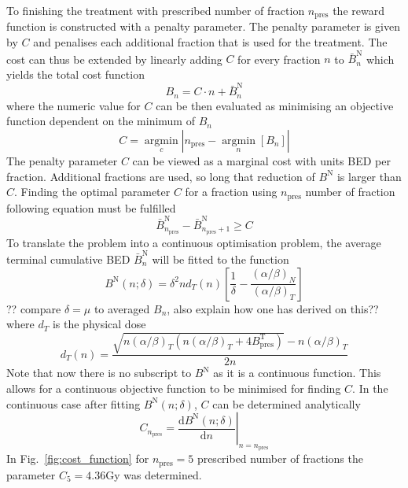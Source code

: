 \documentclass[\relativeRoot/ada.tex]{subfiles}
\begin{document}
To finishing the treatment with prescribed number of fraction $n_{\text{pres}}$ the reward function is constructed with a penalty parameter. The penalty parameter is given by $C$ and penalises each additional fraction  that is used for the treatment. The cost can thus be extended by linearly adding $C$ for every fraction $n$ to $\bar{B}^{\text{N}}_n$ which yields the total cost function
\begin{equation*}
    B_n = C \cdot n + \bar{B}^{\text{N}}_n
\end{equation*}
where the numeric value for $C$ can be then evaluated as minimising an objective function dependent on the minimum of $B_n$
\begin{equation*}
    C = \underset{c}{\operatorname{argmin}}\left| n_{\text{pres}} - \underset{n}{\operatorname{argmin}} \left[B_n \right] \right|
\end{equation*}
The penalty parameter $C$ can be viewed as a marginal cost with units BED per fraction. Additional fractions are used, so long that reduction of $B^{\text{N}}$ is larger than $C$. Finding the optimal parameter $C$ for a fraction using $n_{\text{pres}}$ number of fraction following equation must be fulfilled
\begin{equation*}
    \bar{B}^{\text{N}}_{n_{\text{pres}}} - \bar{B}^{\text{N}}_{n_{\text{pres}}+1} \geq C
\end{equation*}
To translate the problem into a continuous optimisation problem, the average terminal cumulative BED $\bar{B}^{\text{N}}_n$ will be fitted to the function
\begin{equation}
    B^{\text{N}}(n; \delta) = \delta^2 n d_T(n) \left[ \frac{1}{\delta} - \frac{(\alpha / \beta) _N}{(\alpha / \beta)_T}\right]
\end{equation}
?? compare $\delta=\mu$ to averaged $B_n$, also explain how one has derived on this??
where $d_T$ is the physical dose
\begin{equation*}
    d_T(n) = \frac{\sqrt{n (\alpha / \beta)_T (n (\alpha / \beta)_T + 4 B_{\text{pres}}^{\text{T}})} - n (\alpha / \beta)_T}{2n}
\end{equation*}
Note that now there is no subscript to $B^{\text{N}}$ as it is a continuous function. This allows for a continuous objective function to be minimised for finding $C$. In the continuous case after fitting $B^{\text{N}}(n; \delta)$, $C$ can be determined analytically
\begin{equation*}
    C_{n_{\text{pres}}} = \left.\frac{\text{d} B^{\text{N}}(n; \delta)}{\text{d} n}\right|_{n=n_{\text{pres}}}
\end{equation*}
In Fig.~\ref{fig:cost_function} for $n_{\text{pres}}=5$ prescribed number of fractions the parameter $C_5=4.36$Gy was determined.
\end{document}
